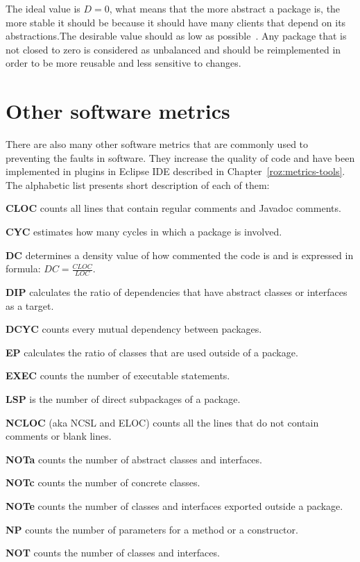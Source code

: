 The ideal value is $D=0$, what means that the more abstract a package is, the more stable it should be because it should have many clients that depend on its abstractions.The desirable value should as low as possible~\cite{martin}. Any package that is not closed to zero is considered as unbalanced and should be reimplemented in order to be more reusable and less sensitive to changes.

\section{Other software metrics}
There are also many other software metrics that are commonly used to preventing the faults in software. They increase the quality of code and have been implemented in plugins in Eclipse IDE described in Chapter~\ref{roz:metrics-tools}. The alphabetic list presents short description of each of them:  

\textbf{\ac{CLOC}} counts all lines that contain regular comments and Javadoc comments.

\textbf{\ac{CYC}} estimates how many cycles in which a package is involved.

\textbf{\ac{DC}} determines a density value of how commented the code is and is expressed in formula: $DC = \frac{CLOC}{LOC}$.

\textbf{\ac{DIP}}  calculates the ratio of dependencies that have abstract classes or interfaces as a target.

\textbf{\ac{DCYC}} counts every mutual dependency between packages.

\textbf{\ac{EP}}  calculates the ratio of classes that are used outside of a package.

\textbf{\ac{EXEC}} counts the number of executable statements.	

\textbf{\ac{LSP}} is the number of direct subpackages of a package.

\textbf{\ac{NCLOC}} (aka NCSL and ELOC) counts all the lines that do not contain comments or blank lines.

\textbf{\ac{NOTa}} counts the number of abstract classes and interfaces.

\textbf{\ac{NOTc}} counts the number of concrete classes.	

\textbf{\ac{NOTe}} counts the number of classes and interfaces exported outside a package.

\textbf{\ac{NP}} counts the number of parameters for a method or a constructor.

\textbf{\ac{NOT}} counts the number of classes and interfaces.

